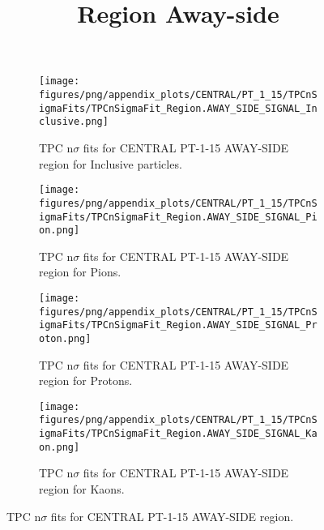             \begin{figure}[H]
                \title{Region Away-side}
                \begin{subfigure}[b]{0.5\textwidth}
                    \centering
                    \texttt{[image: figures/png/appendix\_plots/CENTRAL/PT\_1\_15/TPCnSigmaFits/TPCnSigmaFit\_Region.AWAY\_SIDE\_SIGNAL\_Inclusive.png]}
                    \caption{TPC n$\sigma$ fits for CENTRAL PT-1-15 AWAY-SIDE region for Inclusive particles.}
                    \label{fig:appendix_CENTRAL_PT-1-15_AWAY_SIDE_SIGNAL_Inclusive}
                \end{subfigure}
                \begin{subfigure}[b]{0.5\textwidth}
                    \centering
                    \texttt{[image: figures/png/appendix\_plots/CENTRAL/PT\_1\_15/TPCnSigmaFits/TPCnSigmaFit\_Region.AWAY\_SIDE\_SIGNAL\_Pion.png]}
                    \caption{TPC n$\sigma$ fits for CENTRAL PT-1-15 AWAY-SIDE region for Pions.}
                    \label{fig:appendix_CENTRAL_PT-1-15_AWAY_SIDE_SIGNAL_Pion}
                \end{subfigure}
                \begin{subfigure}[b]{0.5\textwidth}
                    \centering
                    \texttt{[image: figures/png/appendix\_plots/CENTRAL/PT\_1\_15/TPCnSigmaFits/TPCnSigmaFit\_Region.AWAY\_SIDE\_SIGNAL\_Proton.png]}
                    \caption{TPC n$\sigma$ fits for CENTRAL PT-1-15 AWAY-SIDE region for Protons.}
                    \label{fig:appendix_CENTRAL_PT-1-15_AWAY_SIDE_SIGNAL_Proton}
                \end{subfigure}
                \begin{subfigure}[b]{0.5\textwidth}
                    \centering
                    \texttt{[image: figures/png/appendix\_plots/CENTRAL/PT\_1\_15/TPCnSigmaFits/TPCnSigmaFit\_Region.AWAY\_SIDE\_SIGNAL\_Kaon.png]}
                    \caption{TPC n$\sigma$ fits for CENTRAL PT-1-15 AWAY-SIDE region for Kaons.}
                    \label{fig:appendix_CENTRAL_PT-1-15_AWAY_SIDE_SIGNAL_Kaon}
                \end{subfigure}
                \caption{TPC n$\sigma$ fits for CENTRAL PT-1-15 AWAY-SIDE region.}
                \label{fig:appendix_CENTRAL_PT-1-15_AWAY_SIDE_SIGNAL}
            \end{figure}
